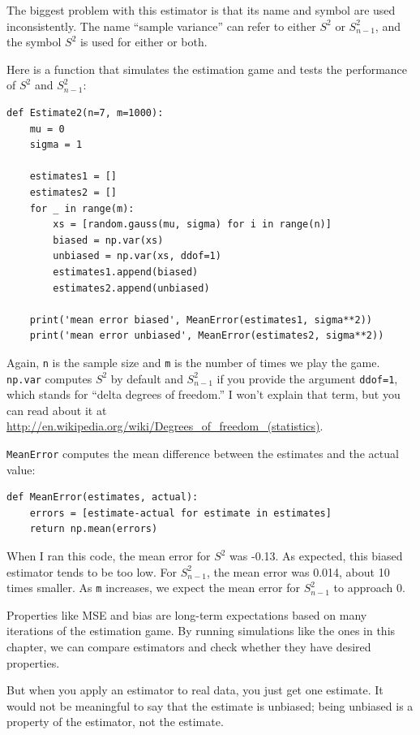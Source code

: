\documentclass[12pt]{book}
\begin{document}
The biggest problem with this estimator is that its name and symbol
are used inconsistently.  The name ``sample variance'' can refer to
either $S^2$ or $S_{n-1}^2$, and the symbol $S^2$ is used
for either or both.

Here is a function that simulates the estimation game and tests
the performance of $S^2$ and $S_{n-1}^2$:

\begin{verbatim}
def Estimate2(n=7, m=1000):
    mu = 0
    sigma = 1

    estimates1 = []
    estimates2 = []
    for _ in range(m):
        xs = [random.gauss(mu, sigma) for i in range(n)]
        biased = np.var(xs)
        unbiased = np.var(xs, ddof=1)
        estimates1.append(biased)
        estimates2.append(unbiased)

    print('mean error biased', MeanError(estimates1, sigma**2))
    print('mean error unbiased', MeanError(estimates2, sigma**2))
\end{verbatim}

Again, \verb"n" is the sample size and \verb"m" is the number of times
we play the game.  \verb"np.var" computes $S^2$ by default and
$S_{n-1}^2$ if you provide the argument \verb"ddof=1", which stands for
``delta degrees of freedom.''  I won't explain that term, but you can read
about it at
\url{http://en.wikipedia.org/wiki/Degrees_of_freedom_(statistics)}.

\verb"MeanError" computes the mean difference between the estimates
and the actual value:

\begin{verbatim}
def MeanError(estimates, actual):
    errors = [estimate-actual for estimate in estimates]
    return np.mean(errors)
\end{verbatim}

When I ran this code, the mean error for $S^2$ was -0.13.  As
expected, this biased estimator tends to be too low.  For $S_{n-1}^2$,
the mean error was 0.014, about 10 times smaller.  As \verb"m"
increases, we expect the mean error for $S_{n-1}^2$ to approach 0.

Properties like MSE and bias are long-term expectations based on
many iterations of the estimation game.  By running simulations like
the ones in this chapter, we can compare estimators and check whether
they have desired properties.

But when you apply an estimator to real
data, you just get one estimate.  It would not be meaningful to say
that the estimate is unbiased; being unbiased is a property of the
estimator, not the estimate.
\end{document}
